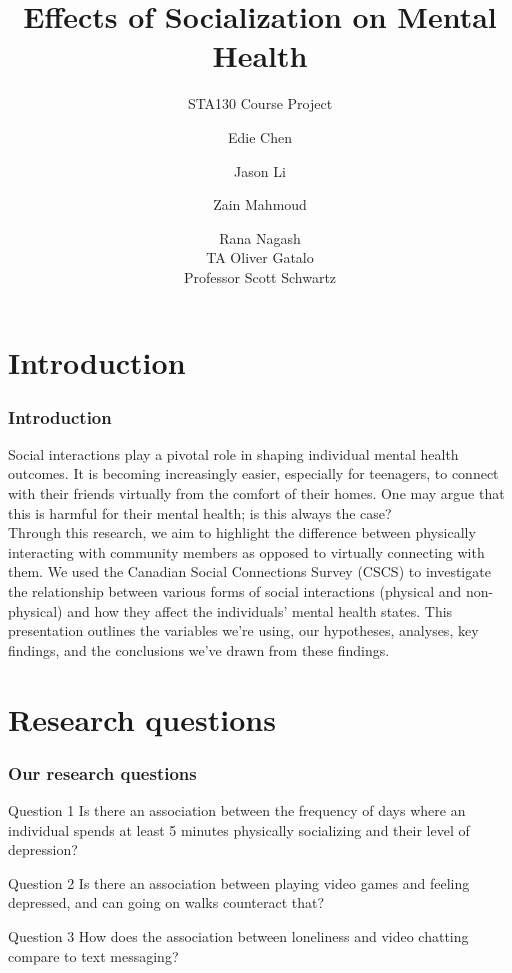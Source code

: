 \documentclass{beamer}
\title[Social Connections Analysis]
{Effects of Socialization on Mental Health}
\subtitle{STA130 Course Project}
\author[STA130] %
{Edie Chen \and Jason Li \and Zain Mahmoud \and Rana Nagash\\
TA Oliver Gatalo\\
Professor Scott Schwartz}
\institute[UofT] %
{
  STA130: An Introduction to Statistical Reasoning and Data Science\\
  Department of Statistical Sciences\\
  University of Toronto
}
\date[November 2024] %
\begin{document}
\frame{\titlepage}


\section{Introduction}

\begin{frame}
\frametitle{Introduction}
Social interactions play a pivotal role in shaping individual mental health outcomes. It is becoming increasingly easier, especially for teenagers, to connect with their friends virtually from the comfort of their homes. One may argue that this is harmful for their mental health; is this always the case?\\
Through this research, we aim to highlight the difference between physically interacting with community members as opposed to virtually connecting with them. We used the \alert{Canadian Social Connections Survey (CSCS)} to investigate the relationship between various forms of social interactions (physical and non-physical) and how they affect the individuals' mental health states. 
This presentation outlines the variables we're using, our hypotheses, analyses, key findings, and the conclusions we've drawn from these findings.
\end{frame}


\section{Research questions}

\begin{frame}
\frametitle{Our research questions}

\begin{block}{Question 1}
    Is there an association between the frequency of days where an individual spends at least 5 minutes physically socializing and their level of depression?
\end{block}

\begin{block}{Question 2}
Is there an association between playing video games and feeling depressed, and can going on walks counteract that?
\end{block}

\begin{block}{Question 3}
    How does the association between loneliness and video chatting compare to text messaging?
\end{block}
\end{frame}
\end{document}
